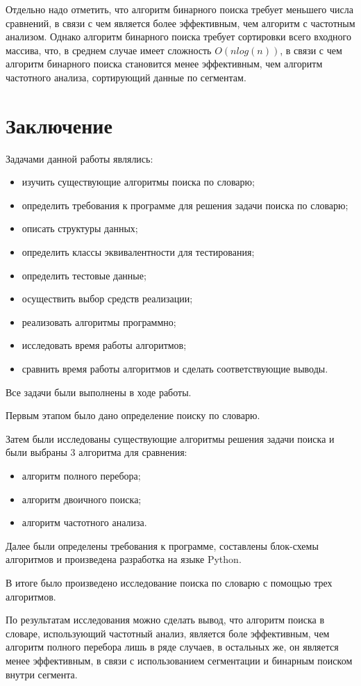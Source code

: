 \documentclass[12pt]{report}
\begin{document}
	Отдельно надо отметить, что алгоритм бинарного поиска требует меньшего числа сравнений, в связи с чем является более эффективным, чем алгоритм с частотным анализом. Однако алгоритм бинарного поиска требует сортировки всего входного массива, что, в среднем случае имеет сложность $O(nlog(n))$, в связи с чем алгоритм бинарного поиска становится менее эффективным, чем алгоритм частотного анализа, сортирующий данные по сегментам.
	
	\newpage
	\chapter*{Заключение}
	Задачами данной работы являлись:
	
	\begin{itemize}
		\item изучить существующие алгоритмы поиска по словарю;
		\item определить требования к программе для решения задачи поиска по словарю;
		\item описать структуры данных;
		\item определить классы эквивалентности для тестирования;
		\item определить тестовые данные;
		\item осуществить выбор средств реализации;
		\item реализовать алгоритмы программно;
		\item исследовать время работы алгоритмов;
		\item сравнить время работы алгоритмов и сделать соответствующие выводы.
	\end{itemize}

	Все задачи были выполнены в ходе работы.

	Первым этапом было дано определение поиску по словарю.

	Затем были исследованы существующие алгоритмы решения задачи поиска и были выбраны 3
	алгоритма для сравнения:
	\begin{itemize}
		\item алгоритм полного перебора;
		\item алгоритм двоичного поиска;
		\item алгоритм частотного анализа.
	\end{itemize}

	Далее были определены требования к программе, составлены блок-схемы алгоритмов и произведена разработка на языке Python.

	В итоге было произведено исследование поиска по словарю с помощью трех алгоритмов.
	
	По результатам исследования можно сделать вывод, что алгоритм поиска в словаре, использующий частотный анализ, является боле эффективным, чем алгоритм полного перебора лишь в ряде случаев, в остальных же, он является менее эффективным, в связи с использованием сегментации и бинарным поиском внутри сегмента.
	
	
	
\end{document}
